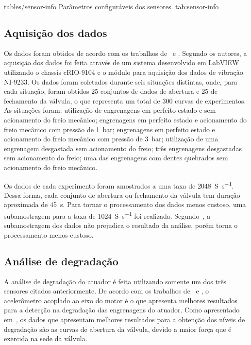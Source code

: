   {tables/sensor-info}
  {Parâmetros configuráveis dos sensores.}
  {tab:sensor-info}



\subsection{Aquisição dos dados}

Os dados foram obtidos de acordo com os trabalhos de~\cite{boesch2011deteccao} e
\cite{faccin2011manutencao}. Segundo os autores, a aquisição dos dados foi feita através de um
sistema desenvolvido em LabVIEW utilizando o chassis {cRIO-9104} e o módulo para aquisição dos dados
de vibração {NI-9233}. Os dados foram coletados durante seis situações distintas, onde, para cada
situação, foram obtidos \num{25} conjuntos de dados de abertura e \num{25} de fechamento da válvula,
o que representa um total de \num{300} curvas de experimentos. As situações foram: utilização de
engrenagens em perfeito estado e sem acionamento do freio mecânico; engrenagens em perfeito estado e
acionamento do freio mecânico com pressão de \SI{1}{\bar}; engrenagens em perfeito estado e
acionamento do freio mecânico com pressão de \SI{3}{\bar}; utilização de uma engrenagem desgastada
sem acionamento do freio; três engrenagens desgastadas sem acionamento do freio; uma das engrenagens
com dentes quebrados sem acionamento do freio mecânico.

Os dados de cada experimento foram amostrados a uma taxa de \SI{2048}{S\per\second}. Dessa forma,
cada conjunto de abertura ou fechamento da válvula tem duração aproximada de \SI{45}{\second}. Para
tornar o processamento dos dados menos custoso, uma subamostragem para a taxa de
\SI{1024}{S\per\second} foi realizada. Segundo~\cite{faccin2011manutencao}, a subamostragem dos
dados não prejudica o resultado da análise, porém torna o processamento menos custoso.


\subsection{Análise de degradação}

A análise de degradação do atuador é feita utilizando somente um dos três sensores citados
anteriormente. De acordo com os trabalhos de~\cite{boesch2011deteccao} e
\cite{faccin2011manutencao}, o acelerômetro acoplado ao eixo do motor é o que apresenta melhores
resultados para a detecção na degradação das engrenagens do atuador. Como apresentado
em~\cite{lazzaretti2012avaliacao}, os dados que apresentam melhores resultados para a obtenção dos
níveis de degradação são as curvas de abertura da válvula, devido a maior força que é exercida na
sede da válvula.

